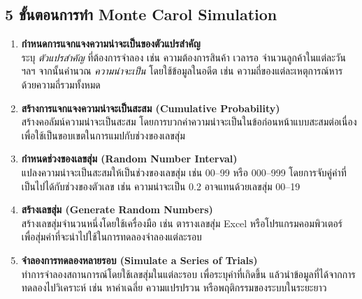 \subsection*{5 ขั้นตอนการทำ Monte Carol Simulation}
\begin{enumerate}
    \item \textbf{กำหนดการแจกแจงความน่าจะเป็นของตัวแปรสำคัญ} \\
    ระบุ \textit{ตัวแปรสำคัญ} ที่ต้องการจำลอง เช่น ความต้องการสินค้า เวลารอ จำนวนลูกค้าในแต่ละวัน ฯลฯ จากนั้นคำนวณ \textit{ความน่าจะเป็น} โดยใช้ข้อมูลในอดีต เช่น ความถี่ของแต่ละเหตุการณ์หารด้วยความถี่รวมทั้งหมด
    
    \item \textbf{สร้างการแจกแจงความน่าจะเป็นสะสม (Cumulative Probability)} \\
    สร้างคอลัมน์ความน่าจะเป็นสะสม โดยการบวกค่าความน่าจะเป็นในข้อก่อนหน้าแบบสะสมต่อเนื่อง เพื่อใช้เป็นขอบเขตในการแมปกับช่วงของเลขสุ่ม
    
    \item \textbf{กำหนดช่วงของเลขสุ่ม (Random Number Interval)} \\
    แปลงความน่าจะเป็นสะสมให้เป็นช่วงของเลขสุ่ม เช่น 00--99 หรือ 000--999 โดยการจับคู่ค่าที่เป็นไปได้กับช่วงของตัวเลข เช่น ความน่าจะเป็น 0.2 อาจแทนด้วยเลขสุ่ม 00--19
    
    \item \textbf{สร้างเลขสุ่ม (Generate Random Numbers)} \\
    สร้างเลขสุ่มจำนวนหนึ่งโดยใช้เครื่องมือ เช่น ตารางเลขสุ่ม Excel หรือโปรแกรมคอมพิวเตอร์ เพื่อสุ่มค่าที่จะนำไปใช้ในการทดลองจำลองแต่ละรอบ
    
    \item \textbf{จำลองการทดลองหลายรอบ (Simulate a Series of Trials)} \\
    ทำการจำลองสถานการณ์โดยใช้เลขสุ่มในแต่ละรอบ เพื่อระบุค่าที่เกิดขึ้น แล้วนำข้อมูลที่ได้จากการทดลองไปวิเคราะห์ เช่น หาค่าเฉลี่ย ความแปรปรวน หรือพฤติกรรมของระบบในระยะยาว
\end{enumerate}

